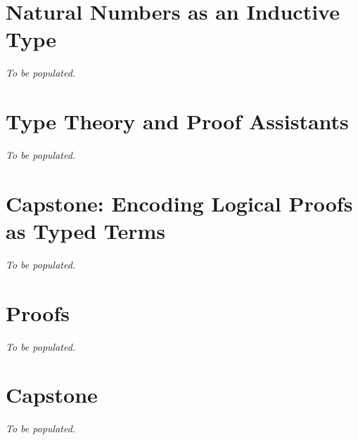 \section{Natural Numbers as an Inductive Type}
\textit{To be populated.}

\section{Type Theory and Proof Assistants}
\textit{To be populated.}

\section{Capstone: Encoding Logical Proofs as Typed Terms}
\textit{To be populated.}

\section*{Proofs}
\textit{To be populated.}

\section*{Capstone}
\textit{To be populated.}
